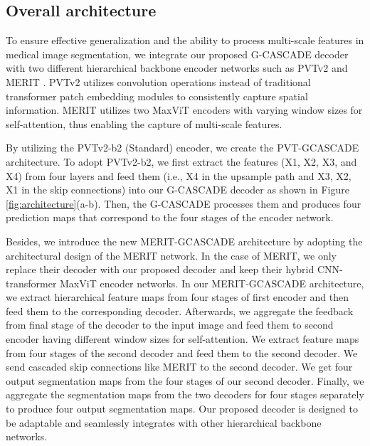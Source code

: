 \documentclass[10pt,twocolumn,letterpaper]{article}
\begin{document}
\subsection{Overall architecture}

To ensure effective generalization and the ability to process multi-scale features in medical image segmentation, we integrate our proposed G-CASCADE decoder with two different hierarchical backbone encoder networks such as PVTv2 \cite{wang2022pvt} and MERIT \cite{rahman2023multi}. PVTv2 utilizes convolution operations instead of traditional transformer patch embedding modules to consistently capture spatial information. MERIT utilizes two MaxViT \cite{tu2022maxvit} encoders with varying window sizes for self-attention, thus enabling the capture of multi-scale features. 

By utilizing the PVTv2-b2 (Standard) encoder, we create the PVT-GCASCADE architecture. To adopt PVTv2-b2, we first extract the features (X1, X2, X3, and X4) from four layers and feed them (i.e., X4 in the upsample path and X3, X2, X1 in the skip connections) into our G-CASCADE decoder as shown in Figure \ref{fig:architecture}(a-b). Then, the G-CASCADE processes them and produces four prediction maps that correspond to the four stages of the encoder network.

Besides, we introduce the new MERIT-GCASCADE architecture by adopting the architectural design of the MERIT network. In the case of MERIT, we only replace their decoder with our proposed decoder and keep their hybrid CNN-transformer MaxViT \cite{tu2022maxvit} encoder networks. In our MERIT-GCASCADE architecture, we extract hierarchical feature maps from four stages of first encoder and then feed them to the corresponding decoder. Afterwards, we aggregate the feedback from final stage of the decoder to the input image and feed them to second encoder having different window sizes for self-attention. We extract feature maps from four stages of the second decoder and feed them to the second decoder. We send cascaded skip connections like MERIT \cite{rahman2023multi} to the second decoder. We get four output segmentation maps from the four stages of our second decoder. Finally, we aggregate the segmentation maps from the two decoders for four stages separately to produce four output segmentation maps. Our proposed decoder is designed to be adaptable and seamlessly integrates with other hierarchical backbone networks. 
\end{document}
